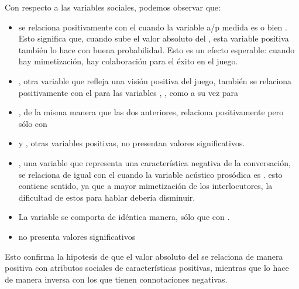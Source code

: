 Con respecto a las variables sociales, podemos observar que:

\begin{itemize}
  \item \svcontributes se relaciona positivamente con el \absentrainment cuando la variable a/p medida es \FOMEAN o bien \NOISETOHARMONICS. Esto significa que, cuando sube el valor absoluto del \entrainment, esta variable positiva también lo hace con buena probabilidad. Esto es un efecto esperable: cuando hay mimetización, hay colaboración para el éxito en el juego.
  \item \svclear, otra variable que refleja una visión positiva del juego, también se relaciona positivamente con el \absentrainment para las variables \FOMEAN, \NOISETOHARMONICS, \ENGMAX como a su vez para \PHONAVG
  \item \svengaged, de la misma manera que las dos anteriores, relaciona positivamente pero sólo con \FOMEAN
  \item \svplanning y \svencourages, otras variables positivas, no presentan valores significativos.
  \item \svdifficult, una variable que representa una característica negativa de la conversación, se relaciona de igual con el \absentrainment cuando la variable acústico prosódica es \ENGMAX. esto contiene sentido, ya que a mayor mimetización de los interlocutores, la dificultad de estos para hablar debería disminuir.
  \item La variable \svbored se comporta de idéntica manera, sólo que con \FOMEAN.
  \item \svdislikes no presenta valores significativos
\end{itemize}

Esto confirma la hipotesis de que el valor absoluto del \entrainment se relaciona de manera positiva con atributos sociales de características positivas, mientras que lo hace de manera inversa con los que tienen connotaciones negativas.



